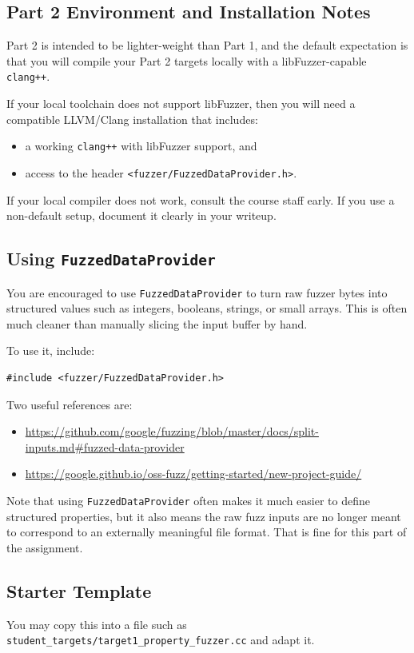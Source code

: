 \documentclass[11pt]{article}
\begin{document}
\subsection*{Part 2 Environment and Installation Notes}
Part 2 is intended to be lighter-weight than Part 1, and the default expectation is that you will compile your Part 2 targets locally with a libFuzzer-capable \texttt{clang++}.

If your local toolchain does not support libFuzzer, then you will need a compatible LLVM/Clang installation that includes:
\begin{itemize}
    \item a working \texttt{clang++} with libFuzzer support, and
    \item access to the header \texttt{<fuzzer/FuzzedDataProvider.h>}.
\end{itemize}

If your local compiler does not work, consult the course staff early. If you use a non-default setup, document it clearly in your writeup.

\subsection*{Using \texttt{FuzzedDataProvider}}
You are encouraged to use \texttt{FuzzedDataProvider} to turn raw fuzzer bytes into structured values such as integers, booleans, strings, or small arrays. This is often much cleaner than manually slicing the input buffer by hand.

To use it, include:
\begin{lstlisting}[style=cppstyle]
#include <fuzzer/FuzzedDataProvider.h>
\end{lstlisting}

Two useful references are:
\begin{itemize}
    \item \url{https://github.com/google/fuzzing/blob/master/docs/split-inputs.md#fuzzed-data-provider}
    \item \url{https://google.github.io/oss-fuzz/getting-started/new-project-guide/}
\end{itemize}

Note that using \texttt{FuzzedDataProvider} often makes it much easier to define structured properties, but it also means the raw fuzz inputs are no longer meant to correspond to an externally meaningful file format. That is fine for this part of the assignment.

\subsection*{Starter Template}
You may copy this into a file such as \texttt{student\_targets/target1\_property\_fuzzer.cc} and adapt it.
\end{document}
